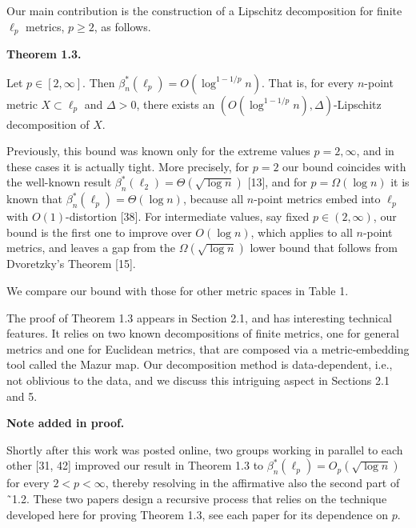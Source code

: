 Our main contribution is the construction of a Lipschitz decomposition for finite $\ell_{p}$ metrics, $p\geq 2$, as follows.
\par
\par
\par\medskip\noindent\textbf{Theorem 1.3.}\par
Let $p\in[2,\infty]$. Then $\beta^{*}_{n}(\ell_{p})=O(\log^{1-1/p}{n})$. That is, for every $n$-point metric $X\subset\ell_{p}$ and $\Delta>0$, there exists an $(O(\log^{1-1/p}{n}),\Delta)$-Lipschitz decomposition of $X$.
\par
\par
\par
Previously, this bound was known only for the extreme values $p=2,\infty$, and in these cases it is actually tight. More precisely, for $p=2$ our bound coincides with the well-known result $\beta^{*}_{n}(\ell_{2})=\Theta(\sqrt{\log{n}})$ [13], and for $p=\Omega(\log{n})$ it is known that $\beta^{*}_{n}(\ell_{p})=\Theta(\log{n})$, because all $n$-point metrics embed into $\ell_{p}$ with $O(1)$-distortion [38]. For intermediate values, say fixed $p\in(2,\infty)$, our bound is the first one to improve over $O(\log n)$, which applies to all $n$-point metrics, and leaves a gap from the $\Omega(\sqrt{\log{n}})$ lower bound that follows from Dvoretzky’s Theorem [15].
\par
\par
We compare our bound with those for other metric spaces in Table 1.
\par
\par
The proof of Theorem 1.3 appears in Section 2.1, and has interesting technical features. It relies on two known decompositions of finite metrics, one for general metrics and one for Euclidean metrics, that are composed via a metric-embedding tool called the Mazur map. Our decomposition method is data-dependent, i.e., not oblivious to the data, and we discuss this intriguing aspect in Sections 2.1 and 5.
\par
\par
\par\medskip\noindent\textbf{Note added in proof.}\par
Shortly after this work was posted online, two groups working in parallel to each other [31, 42] improved our result in Theorem 1.3 to $\beta^{*}_{n}(\ell_{p})=O_{p}(\sqrt{\log{n}})$ for every $2<p<\infty$, thereby resolving in the affirmative also the second part of ˜1.2. These two papers design a recursive process that relies on the technique developed here for proving Theorem 1.3, see each paper for its dependence on $p$.
